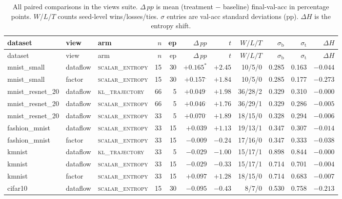 \documentclass[11pt,a4paper]{article}
\newcommand{\scalarH}{\textsc{scalar\_entropy}\xspace}
\newcommand{\klT}{\textsc{kl\_trajectory}\xspace}
\begin{document}
\begin{footnotesize}
\begin{longtable}{@{}lllrrrrrrrr@{}}
\caption{All paired comparisons in the views suite.
$\Delta\,pp$ is mean (treatment $-$ baseline) final-val-acc in percentage
points. $W$/$L$/$T$ counts seed-level wins/losses/ties.
$\sigma$ entries are val-acc standard deviations (pp).
$\Delta H$ is the entropy shift.}
\label{tab:views_suite}\\
\toprule
dataset & view & arm & $n$ & ep & $\Delta\,pp$ & $t$ & $W/L/T$ &
  $\sigma_\text{b}$ & $\sigma_\text{t}$ & $\Delta H$ \\
\midrule
\endfirsthead
\toprule
dataset & view & arm & $n$ & ep & $\Delta\,pp$ & $t$ & $W/L/T$ &
  $\sigma_\text{b}$ & $\sigma_\text{t}$ & $\Delta H$ \\
\midrule
\endhead
\bottomrule
\endfoot
mnist\_small       & dataflow & \scalarH & 15 & 30 & $+0.165^{*}$   & $+2.45$ & 10/5/0   & 0.285 & 0.163 & $-0.044$ \\
mnist\_small       & factor   & \scalarH & 15 & 30 & $+0.157^{.}$   & $+1.84$ & 10/5/0   & 0.285 & 0.177 & $-0.273$ \\
\midrule
mnist\_resnet\_20  & dataflow & \klT     & 66 &  5 & $+0.049^{.}$   & $+1.98$ & 36/28/2  & 0.329 & 0.310 & $-0.000$ \\
mnist\_resnet\_20  & dataflow & \scalarH & 66 &  5 & $+0.046^{.}$   & $+1.76$ & 36/29/1  & 0.329 & 0.286 & $-0.005$ \\
mnist\_resnet\_20  & dataflow & \scalarH & 33 &  5 & $+0.070^{.}$   & $+1.89$ & 18/15/0  & 0.328 & 0.294 & $-0.006$ \\
\midrule
fashion\_mnist     & dataflow & \scalarH & 33 & 15 & $+0.039$       & $+1.13$ & 19/13/1  & 0.347 & 0.307 & $-0.014$ \\
fashion\_mnist     & factor   & \scalarH & 33 & 15 & $-0.009$       & $-0.24$ & 17/16/0  & 0.347 & 0.333 & $-0.038$ \\
\midrule
kmnist             & dataflow & \klT     & 33 &  5 & $-0.029$       & $-1.00$ & 15/17/1  & 0.898 & 0.844 & $-0.000$ \\
kmnist             & dataflow & \scalarH & 33 & 15 & $-0.029$       & $-0.33$ & 15/17/1  & 0.714 & 0.701 & $-0.004$ \\
kmnist             & factor   & \scalarH & 33 & 15 & $+0.097$       & $+1.28$ & 18/15/0  & 0.714 & 0.683 & $-0.007$ \\
\midrule
cifar10            & dataflow & \scalarH & 15 & 30 & $-0.095$       & $-0.43$ &  8/7/0   & 0.530 & 0.758 & $-0.213$ \\

\end{longtable}
\end{footnotesize}
\end{document}

